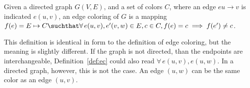 \begin{defi}
Given a directed graph $G(V,E)$, and a set of colors $C$, where an edge $e u \rightarrow v$ is indicated $e(u,v)$, an edge coloring of $G$ is a mapping $f(e) = E \mapsto C \suchthat \forall\, e(u,v), e'(v,w) \in E, c \in C, f(e) = c \implies f(e') \ne c$.

This definition is identical in form to the definition of edge coloring, but the meaning is slightly different. If the graph is not directed, than the endpoints are interchangeable, Definition~\ref{def:ec} could also read $\forall\, e(u,v), e(u,w)$. In a directed graph, however, this is not the case. An edge $(u,w)$ can be the same color as an edge $(u,v)$. 
\end{defi}
